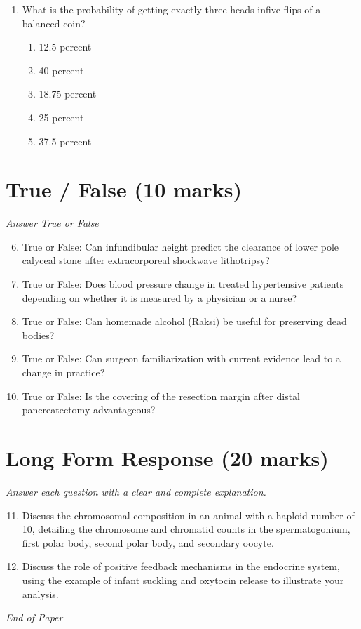 \documentclass[12pt]{article}
\begin{document}
\begin{enumerate}[label=\arabic*.]
\begin{enumerate}[label=(\alph*)]
    \item Thymus
    \item pituitary gland
    \item adrenal gland
    \item thyroid gland
\end{enumerate}
\item What is the probability of getting exactly three heads infive flips of a balanced coin?
\begin{enumerate}[label=(\alph*)]
    \item 12.5 percent
    \item 40 percent
    \item 18.75 percent
    \item 25 percent
    \item 37.5 percent
\end{enumerate}
\end{enumerate}

\section*{True / False (10 marks)}
\textit{Answer True or False}
\begin{enumerate}[label=\arabic*.]
\setcounter{enumi}{5}
\item True or False: Can infundibular height predict the clearance of lower pole calyceal stone after extracorporeal shockwave lithotripsy?
\item True or False: Does blood pressure change in treated hypertensive patients depending on whether it is measured by a physician or a nurse?
\item True or False: Can homemade alcohol (Raksi) be useful for preserving dead bodies?
\item True or False: Can surgeon familiarization with current evidence lead to a change in practice?
\item True or False: Is the covering of the resection margin after distal pancreatectomy advantageous?
\end{enumerate}

\section*{Long Form Response (20 marks)}
\textit{Answer each question with a clear and complete explanation.}
\begin{enumerate}[label=\arabic*.]
\setcounter{enumi}{10}
\item Discuss the chromosomal composition in an animal with a haploid number of 10, detailing the chromosome and chromatid counts in the spermatogonium, first polar body, second polar body, and secondary oocyte.
\item Discuss the role of positive feedback mechanisms in the endocrine system, using the example of infant suckling and oxytocin release to illustrate your analysis.
\end{enumerate}

\vfill
\noindent\textit{End of Paper}
\end{document}
